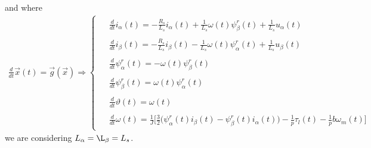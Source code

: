 \documentclass[11pt,a4paper,oneside]{book}
\numberwithin{equation}{section}
\theoremstyle{it}
\theoremstyle{definition}
\begin{document}
and where
\begin{align}\label{pmsm_problem_1_eq_8}
	\frac{d}{dt}\vec{x}(t)=\vec{g}(\vec{x})\Rightarrow\left\lbrace 
	\begin{aligned}
		\begin{split}
			&\frac{d}{dt}i_\alpha(t) = -\frac{R_s}{L_s}i_\alpha(t) + 	
			\frac{1}{L_s}\omega(t)\psi_\beta^r(t) + \frac{1}{L_s} u_\alpha(t) 
		\end{split}	\\[6pt]
		\begin{split}
			&\frac{d}{dt}i_\beta(t) = -\frac{R_s}{L_s}i_\beta(t) - 	
			\frac{1}{L_s}\omega(t)\psi_\alpha^r(t) + \frac{1}{L_s} u_\beta(t)	
		\end{split}	\\[6pt]
		\begin{split}
			&\frac{d}{dt}\psi_\alpha^r(t) = -\omega(t)\psi_\beta^r(t)
		\end{split}	\\[6pt]
		\begin{split}	
			&\frac{d}{dt}\psi_\beta^r(t) = \omega(t)\psi_\alpha^r(t)	
		\end{split}	\\[6pt]
		\begin{split}
			&\frac{d}{dt}\vartheta(t) = \omega(t)
		\end{split}	\\[6pt]
		\begin{split}
			&\frac{d}{dt}\omega(t) = 
			\frac{1}{J}\Bigg[\frac{3}{2}\Big(\psi^r_{\alpha}(t)i_{\beta}(t) - 
			\psi^r_{\beta}(t)i_{\alpha}(t)\Big)  -\frac{1}{p}\tau_l(t) 
			-\frac{1}{p}b\omega_m(t)\Bigg]
		\end{split}
	\end{aligned}\right. 
\end{align}
we are considering $L_\alpha = \L_\beta = L_s$.
\end{document}
